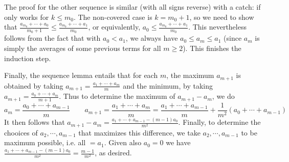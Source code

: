 \documentclass[11pt,a4paper]{article}
\begin{document}
\begin{enumerate}
    The proof for the other sequence is similar (with all signs reverse) with a catch: if only works for $k\le m_0$. 
    The non-covered case is $k=m_0 + 1$, so we need to show that 
    $\frac{a_{m_0} + \cdots + a_{0}}{m_0 + 1}\le \frac{a_{m_0} + \cdots + a_{1}}{m_0}$, 
    or equivalently, $a_0\le \frac{a_{m_0} + \cdots + a_{1}}{m_0}$. 
    This nevertheless follows from the fact that with $a_0<a_1$, we always have $a_0\le a_m\le a_1$ 
    (since $a_m$ is simply the averages of some previous terms for all $m\ge 2$). 
    This finishes the induction step. 
    
    Finally, the sequence lemma entails that for each $m$, 
    the maximum $a_{m+1}$ is obtained by taking $a_{m+1}=\frac{a_1+\cdots + a_m}{m}$ 
    and the minimum, by taking $a_{m+1}=\frac{a_0+\cdots + a_m}{m+1}$. 
    Thus to determine the maximum of $a_{m+1}-a_m$, 
    we do 
    \begin{equation}
    	a_m = \frac{a_0+\cdots + a_{m-1}}{m}
    	\qquad 
    	a_{m+1} = \frac{a_1+\cdots + a_m}{m} = \frac{a_1+\cdots + a_{m-1}}{m} + \frac{1}{m^2}(a_0+\cdots + a_{m-1})
    \end{equation}
    It then follows that $a_{m+1}-a_m = \frac{a_1+\cdots + a_{m-1} - (m-1)a_0}{m^2}$. 
    Finally, to determine the chooices of $a_2, \cdots, a_{m-1}$ that maximizes this difference, 
    we take $a_2, \cdots, a_{m-1}$ to be maximum possible, 
    i.e. all $=a_1$. 
    Given also $a_0=0$ we have $\frac{a_1+\cdots + a_{m-1} - (m-1)a_0}{m^2}=\frac{m-1}{m^2}$, 
    as desired. 
    
\end{enumerate}
\end{document}

